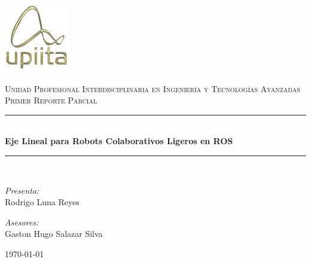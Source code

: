 \begin{titlepage}
 
\begin{center}
\newcommand{\HRule}{\rule{\linewidth}{0.5mm}}
 

\includegraphics[scale=2]{imagenes/upiita}\vspace*{1cm}
 
\textsc{\LARGE Unidad Profesional Interdisciplinaria en Ingeniería y Tecnologías Avanzadas}\\[1.5cm]
 
\textsc{\Large Primer Reporte Parcial}\\[0.5cm]
 
 

\HRule \\[0.4cm]
{ \huge \bfseries Eje Lineal para Robots Colaborativos Ligeros en ROS}\\[0.4cm]
 
\HRule \\[1.5cm]
 

\begin{minipage}{0.4\textwidth}
\begin{flushleft} \large
\emph{Presenta:}\\
Rodrigo Luna Reyes\\
\end{flushleft}
\end{minipage}
\begin{minipage}{0.5\textwidth}
\begin{flushright} \large
\emph{Asesores:} \\
Gaston Hugo Salazar Silva
\end{flushright}
\end{minipage}
 
\vfill
 
{\large \today}
 
\end{center}
 
\end{titlepage}
